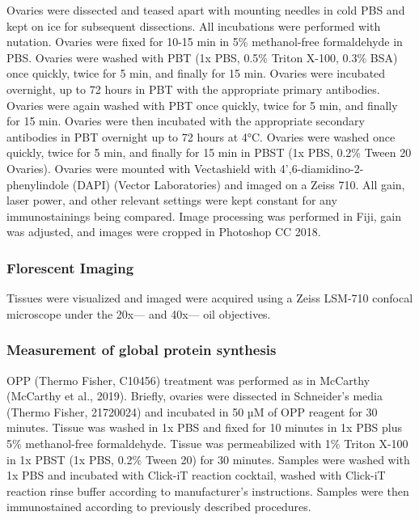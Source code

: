 \documentclass[12pt,oneside]{reedthesis}
\begin{document}
Ovaries were dissected and teased apart with mounting needles in cold PBS and kept on ice for subsequent dissections. All incubations were performed with nutation. Ovaries were fixed for 10-15 min in 5\% methanol-free formaldehyde in PBS. Ovaries were washed with PBT (1x PBS, 0.5\% Triton X-100, 0.3\% BSA) once quickly, twice for 5 min, and finally for 15 min. Ovaries were incubated overnight, up to 72 hours in PBT with the appropriate primary antibodies. Ovaries were again washed with PBT once quickly, twice for 5 min, and finally for 15 min. Ovaries were then incubated with the appropriate secondary antibodies in PBT overnight up to 72 hours at 4°C. Ovaries were washed once quickly, twice for 5 min, and finally for 15 min in PBST (1x PBS, 0.2\% Tween 20 Ovaries). Ovaries were mounted with Vectashield with 4',6-diamidino-2-phenylindole (DAPI) (Vector Laboratories) and imaged on a Zeiss 710. All gain, laser power, and other relevant settings were kept constant for any immunostainings being compared. Image processing was performed in Fiji, gain was adjusted, and images were cropped in Photoshop CC 2018.

\hypertarget{florescent-imaging}{%
\subsubsection{Florescent Imaging}\label{florescent-imaging}}

Tissues were visualized and imaged were acquired using a Zeiss LSM-710 confocal microscope under the 20x--- and 40x--- oil objectives.

\hypertarget{measurement-of-global-protein-synthesis}{%
\subsubsection{Measurement of global protein synthesis}\label{measurement-of-global-protein-synthesis}}

OPP (Thermo Fisher, C10456) treatment was performed as in McCarthy (McCarthy et al., 2019). Briefly, ovaries were dissected in Schneider's media (Thermo Fisher, 21720024) and incubated in 50 µM of OPP reagent for 30 minutes. Tissue was washed in 1x PBS and fixed for 10 minutes in 1x PBS plus 5\% methanol-free formaldehyde. Tissue was permeabilized with 1\% Triton X-100 in 1x PBST (1x PBS, 0.2\% Tween 20) for 30 minutes. Samples were washed with 1x PBS and incubated with Click-iT reaction cocktail, washed with Click-iT reaction rinse buffer according to manufacturer's instructions. Samples were then immunostained according to previously described procedures.
\end{document}
